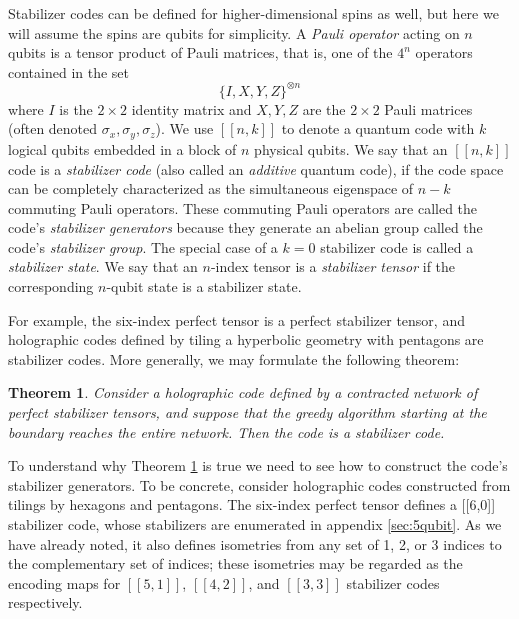 \documentclass[12pt]{article}
\theoremstyle{plain}
\newtheorem{theorem}{Theorem}
\theoremstyle{plain}
\theoremstyle{plain}
\theoremstyle{plain}
\theoremstyle{result}
\theoremstyle{remark}
\theoremstyle{conjecture}
\theoremstyle{observation}
\theoremstyle{definition}
\theoremstyle{corollary}
\theoremstyle{definition}
\theoremstyle{definition}
\theoremstyle{assumption}
\theoremstyle{definition}
\theoremstyle{problem}
\theoremstyle{fact}
\newcommand{\be}{\begin{equation}}
\newcommand{\ee}{\end{equation}}
\begin{document}
Stabilizer codes can be defined for higher-dimensional spins as well, but here we will assume the spins are qubits for simplicity. A \textit{Pauli operator} acting on $n$ qubits is a tensor product of Pauli matrices, that is, one of the $4^n$ operators contained in the set
\be
\{I,X,Y,Z\}^{\otimes n}
\ee
where $I$ is the $2\times 2$ identity matrix and $X, Y, Z$ are the $2\times 2$ Pauli matrices (often denoted $\sigma_x,\sigma_y,\sigma_z$). We use $[[n,k]]$ to denote a quantum code with $k$ logical qubits embedded in a block of $n$ physical qubits. We say that an $[[n,k]]$ code is a \textit{stabilizer code} (also called an \textit{additive} quantum code), if the code space can be completely characterized as the simultaneous eigenspace of $n-k$ commuting Pauli operators. These commuting Pauli operators are called the code's \textit{stabilizer generators} because they generate an abelian group called the code's \textit{stabilizer group}. The special case of a $k=0$ stabilizer code is called a \textit{stabilizer state}. We say that an $n$-index tensor is a \textit{stabilizer tensor} if the corresponding $n$-qubit state is a stabilizer state. 

For example, the six-index perfect tensor is a perfect stabilizer tensor, and holographic codes defined by tiling a hyperbolic geometry with pentagons are stabilizer codes. More generally, we may formulate the following theorem: 

\begin{theorem} \label{thm:stabilizer}
Consider a holographic code defined by a contracted network of perfect stabilizer tensors, and suppose that the greedy algorithm starting at the boundary reaches the entire network. Then the code is a stabilizer code. 
\end{theorem}

\noindent To understand why Theorem \ref{thm:stabilizer} is true we need to see how to construct the code's stabilizer generators. To be concrete, consider holographic codes constructed from tilings by hexagons and pentagons. The six-index perfect tensor defines a [[6,0]] stabilizer code, whose stabilizers are enumerated in appendix \ref{sec:5qubit}. 
As we have already noted, it also defines isometries from any set of 1, 2, or 3 indices to the complementary set of indices; these isometries may be regarded as the encoding maps for $[[5,1]]$, $[[4,2]]$, and $[[3,3]]$ stabilizer codes respectively. 
\end{document}
